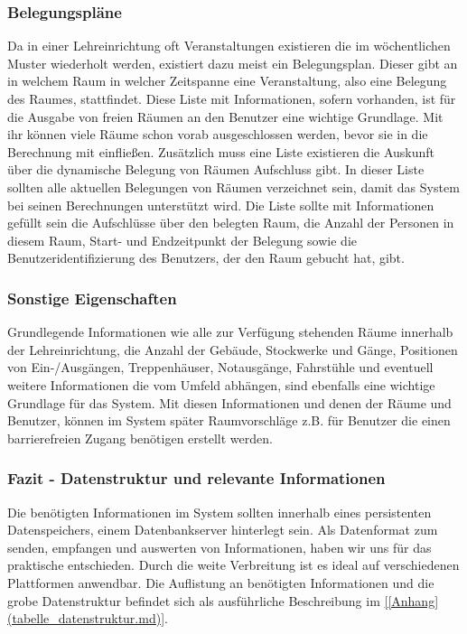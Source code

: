 \subsubsection{Belegungspläne}
\label{sec:Belegungspläne}

Da in einer Lehreinrichtung oft Veranstaltungen existieren die im wöchentlichen
Muster wiederholt werden, existiert dazu meist ein Belegungsplan. Dieser gibt
an in welchem Raum in welcher Zeitspanne eine Veranstaltung, also eine Belegung
des Raumes, stattfindet. Diese Liste mit Informationen, sofern vorhanden, ist
für die Ausgabe von freien Räumen an den Benutzer eine wichtige Grundlage.
Mit ihr können viele Räume schon vorab ausgeschlossen werden, bevor sie in die
Berechnung mit einfließen. Zusätzlich muss eine Liste existieren die Auskunft
über die dynamische Belegung von Räumen Aufschluss gibt. In dieser Liste
sollten alle aktuellen Belegungen von Räumen verzeichnet sein, damit das System
bei seinen Berechnungen unterstützt wird. Die Liste sollte mit Informationen
gefüllt sein die Aufschlüsse über den belegten Raum, die Anzahl der Personen in
diesem Raum, Start- und Endzeitpunkt der Belegung sowie die
Benutzeridentifizierung des Benutzers, der den Raum gebucht hat, gibt.

\subsubsection{Sonstige Eigenschaften}
\label{sec:Sonstige_Eigenschaften}

Grundlegende Informationen wie alle zur Verfügung stehenden Räume innerhalb der
Lehreinrichtung, die Anzahl der Gebäude, Stockwerke und Gänge, Positionen von
Ein-/Ausgängen, Treppenhäuser, Notausgänge, Fahrstühle und eventuell weitere
Informationen die vom Umfeld abhängen, sind ebenfalls eine wichtige Grundlage
für das System. Mit diesen Informationen und denen der Räume und Benutzer,
können im System später Raumvorschläge z.B. für Benutzer die einen
barrierefreien Zugang benötigen erstellt werden.

\subsubsection{Fazit - Datenstruktur und relevante Informationen}
\label{sec:Fazit_Datenstruktur_und_relevante_Informationen}

Die benötigten Informationen im System sollten innerhalb eines persistenten
Datenspeichers, \bspw einem Datenbankserver hinterlegt sein. Als Datenformat
zum senden, empfangen und auswerten von Informationen, haben wir uns für das
praktische \citep{[JSON]()} entschieden. Durch die weite Verbreitung ist es ideal auf
verschiedenen Plattformen anwendbar. Die Auflistung an benötigten
Informationen und die grobe Datenstruktur befindet sich als ausführliche
Beschreibung im \ref{[Anhang](tabelle_datenstruktur.md)}.



